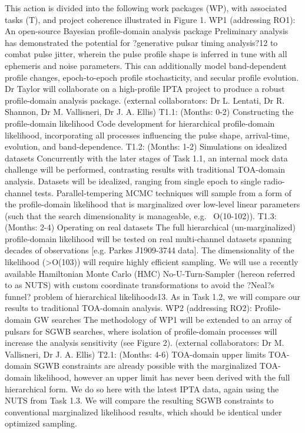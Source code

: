 \documentclass[11pt,letterpaper,sans]{moderncv} %
\begin{document}
\noindent This action is divided into the following work packages (WP), with associated tasks (T), and project coherence illustrated in Figure 1. 
WP1 (addressing RO1): An open-source Bayesian profile-domain analysis package
Preliminary analysis has demonstrated the potential for ?generative pulsar timing analysis?12 to combat pulse jitter, wherein the pulse profile shape is inferred in tune with all ephemeris and noise parameters. This can additionally model band-dependent profile changes, epoch-to-epoch profile stochasticity, and secular profile evolution. Dr Taylor will collaborate on a high-profile IPTA project to produce a robust profile-domain analysis package. (external collaborators: Dr L. Lentati, Dr R. Shannon, Dr M. Vallisneri, Dr J. A. Ellis)
T1.1: (Months: 0-2) Constructing the profile-domain likelihood 
Code development for hierarchical profile-domain likelihood, incorporating all processes influencing the pulse shape, arrival-time, evolution, and band-dependence. 
T1.2: (Months: 1-2) Simulations on idealized datasets 
Concurrently with the later stages of Task 1.1, an internal mock data challenge will be performed, contrasting results with traditional TOA-domain analysis. Datasets will be idealized, ranging from single epoch to single radio-channel tests. Parallel-tempering MCMC techniques will sample from a form of the profile-domain likelihood that is marginalized over low-level linear parameters (such that the search dimensionality is manageable, e.g. ~O(10-102)).
T1.3: (Months: 2-4) Operating on real datasets 
The full hierarchical (un-marginalized) profile-domain likelihood will be tested on real multi-channel datasets spanning decades of observations [e.g. Parkes J1909-3744 data]. The dimensionality of the likelihood (>O(103)) will require highly efficient sampling. We will use a recently available Hamiltonian Monte Carlo (HMC) No-U-Turn-Sampler (hereon referred to as NUTS) with custom coordinate transformations to avoid the ?Neal?s funnel? problem of hierarchical likelihoods13. As in Task 1.2, we will compare our results to traditional TOA-domain analysis.
WP2 (addressing RO2): Profile-domain GW searches
The methodology of WP1 will be extended to an array of pulsars for SGWB searches, where isolation of profile-domain processes will increase the analysis sensitivity (see Figure 2). (external collaborators: Dr M. Vallisneri, Dr J. A. Ellis)
	T2.1: (Months: 4-6) TOA-domain upper limits
	TOA-domain SGWB constraints are already possible with the marginalized TOA-domain likelihood, however an upper limit has never been derived with the full hierarchical form. We do so here with the latest IPTA data, again using the NUTS from Task 1.3. We will compare the resulting SGWB constraints to conventional marginalized likelihood results, which should be identical under optimized sampling.
\end{document}
